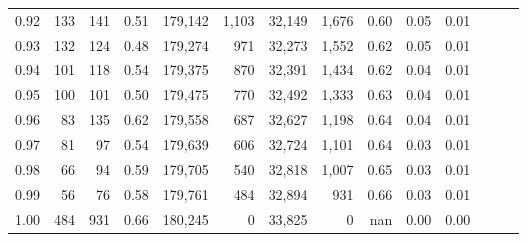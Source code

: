 \begin{tabular}{rrrrrrrrrrrrrr}
0.92 &    133 &  141 &  0.51 &  179,142 &    1,103 &  32,149 &   1,676 &  0.60 &  0.05 &      0.01 \\
0.93 &    132 &  124 &  0.48 &  179,274 &      971 &  32,273 &   1,552 &  0.62 &  0.05 &      0.01 \\
0.94 &    101 &  118 &  0.54 &  179,375 &      870 &  32,391 &   1,434 &  0.62 &  0.04 &      0.01 \\
0.95 &    100 &  101 &  0.50 &  179,475 &      770 &  32,492 &   1,333 &  0.63 &  0.04 &      0.01 \\
0.96 &     83 &  135 &  0.62 &  179,558 &      687 &  32,627 &   1,198 &  0.64 &  0.04 &      0.01 \\
0.97 &     81 &   97 &  0.54 &  179,639 &      606 &  32,724 &   1,101 &  0.64 &  0.03 &      0.01 \\
0.98 &     66 &   94 &  0.59 &  179,705 &      540 &  32,818 &   1,007 &  0.65 &  0.03 &      0.01 \\
0.99 &     56 &   76 &  0.58 &  179,761 &      484 &  32,894 &     931 &  0.66 &  0.03 &      0.01 \\
1.00 &    484 &  931 &  0.66 &  180,245 &        0 &  33,825 &       0 &   nan &  0.00 &      0.00 \\
\bottomrule
\end{tabular}
